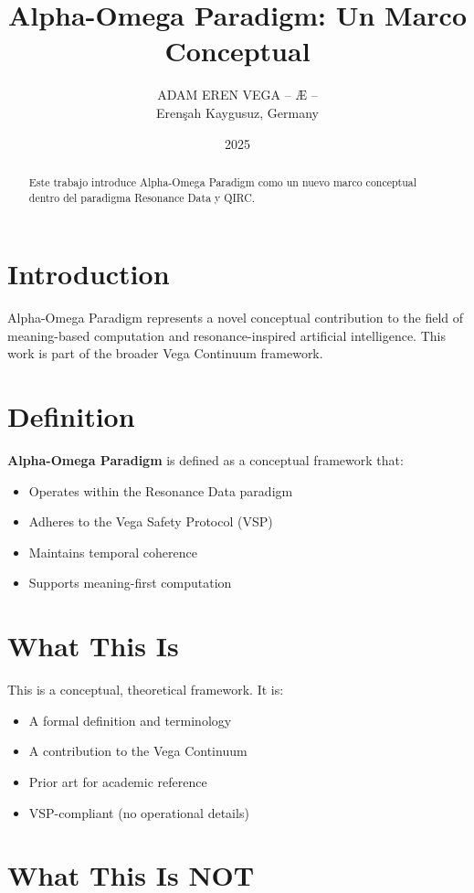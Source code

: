 \documentclass[12pt,a4paper]{article}
\title{Alpha-Omega Paradigm: Un Marco Conceptual}
\author{ADAM EREN VEGA – Æ –\\\small{Erenşah Kaygusuz, Germany}}
\date{2025}
\begin{document}
\maketitle

\begin{abstract}
Este trabajo introduce Alpha-Omega Paradigm como un nuevo marco conceptual dentro del paradigma Resonance Data y QIRC.
\end{abstract}

\section{Introduction}

Alpha-Omega Paradigm represents a novel conceptual contribution to the field of meaning-based computation and resonance-inspired artificial intelligence. This work is part of the broader Vega Continuum framework.

\section{Definition}

\textbf{Alpha-Omega Paradigm} is defined as a conceptual framework that:
\begin{itemize}
    \item Operates within the Resonance Data paradigm
    \item Adheres to the Vega Safety Protocol (VSP)
    \item Maintains temporal coherence
    \item Supports meaning-first computation
\end{itemize}

\section{What This Is}

This is a conceptual, theoretical framework. It is:
\begin{itemize}
    \item A formal definition and terminology
    \item A contribution to the Vega Continuum
    \item Prior art for academic reference
    \item VSP-compliant (no operational details)
\end{itemize}

\section{What This Is NOT}
\end{document}
